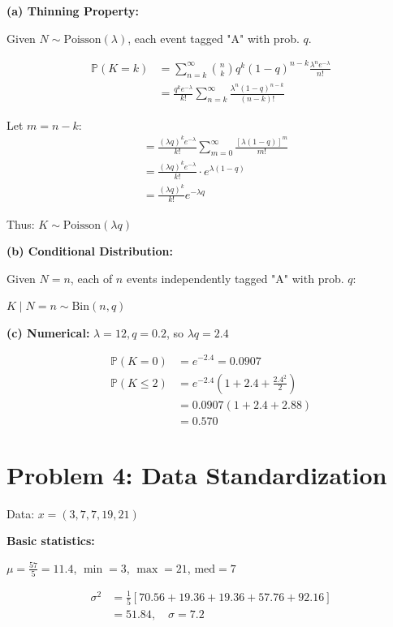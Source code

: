 \documentclass[10pt,twocolumn]{article}
\begin{document}
\textbf{(a) Thinning Property:}

Given \(N \sim \text{Poisson}(\lambda)\), each event tagged "A" with prob. \(q\).

\begin{align*}
\mathbb{P}(K=k) &= \sum_{n=k}^{\infty} \binom{n}{k}q^k(1-q)^{n-k} \frac{\lambda^n e^{-\lambda}}{n!} \\
&= \frac{q^k e^{-\lambda}}{k!} \sum_{n=k}^{\infty} \frac{\lambda^n(1-q)^{n-k}}{(n-k)!}
\end{align*}

Let \(m=n-k\):
\begin{align*}
&= \frac{(\lambda q)^k e^{-\lambda}}{k!} \sum_{m=0}^{\infty} \frac{[\lambda(1-q)]^m}{m!} \\
&= \frac{(\lambda q)^k e^{-\lambda}}{k!} \cdot e^{\lambda(1-q)} \\
&= \frac{(\lambda q)^k}{k!} e^{-\lambda q}
\end{align*}

Thus: \(\boxed{K \sim \text{Poisson}(\lambda q)}\)

\textbf{(b) Conditional Distribution:}

Given \(N=n\), each of \(n\) events independently tagged "A" with prob. \(q\):

\(\boxed{K \mid N=n \sim \text{Bin}(n,q)}\)

\textbf{(c) Numerical:} \(\lambda=12, q=0.2\), so \(\lambda q = 2.4\)

\begin{align*}
\mathbb{P}(K=0) &= e^{-2.4} = \boxed{0.0907} \\
\mathbb{P}(K \leq 2) &= e^{-2.4}\left(1 + 2.4 + \frac{2.4^2}{2}\right) \\
&= 0.0907(1 + 2.4 + 2.88) \\
&= \boxed{0.570}
\end{align*}

\section*{Problem 4: Data Standardization}

Data: \(x = (3,7,7,19,21)\)

\textbf{Basic statistics:}

\(\mu = \frac{57}{5} = 11.4\), \(\min = 3\), \(\max = 21\), \(\text{med} = 7\)

\begin{align*}
\sigma^2 &= \frac{1}{5}[70.56 + 19.36 + 19.36 + 57.76 + 92.16] \\
&= 51.84, \quad \sigma = 7.2
\end{align*}
\end{document}
